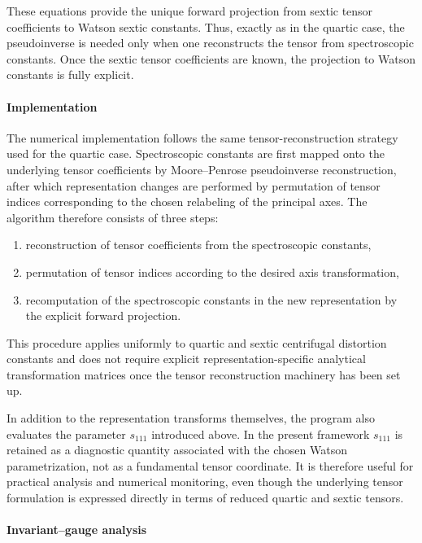 These equations provide the unique forward projection from sextic tensor
coefficients to Watson sextic constants.  Thus, exactly as in the quartic case,
the pseudoinverse is needed only when one reconstructs the tensor from
spectroscopic constants.  Once the sextic tensor coefficients are known, the
projection to Watson constants is fully explicit.

\paragraph{Implementation}

The numerical implementation follows the same tensor-reconstruction strategy
used for the quartic case.  Spectroscopic constants are first mapped onto the
underlying tensor coefficients by Moore--Penrose pseudoinverse reconstruction,
after which representation changes are performed by permutation of tensor
indices corresponding to the chosen relabeling of the principal axes.  The
algorithm therefore consists of three steps:

\begin{enumerate}
\item reconstruction of tensor coefficients from the spectroscopic constants,
\item permutation of tensor indices according to the desired axis
transformation,
\item recomputation of the spectroscopic constants in the new representation by
the explicit forward projection.
\end{enumerate}

This procedure applies uniformly to quartic and sextic centrifugal distortion
constants and does not require explicit representation-specific analytical
transformation matrices once the tensor reconstruction machinery has been set
up.

In addition to the representation transforms themselves, the program also
evaluates the parameter $s_{111}$ introduced above.  In the present framework
$s_{111}$ is retained as a diagnostic quantity associated with the chosen
Watson parametrization, not as a fundamental tensor coordinate.  It is therefore
useful for practical analysis and numerical monitoring, even though the
underlying tensor formulation is expressed directly in terms of reduced quartic
and sextic tensors.

\paragraph{Invariant--gauge analysis}

